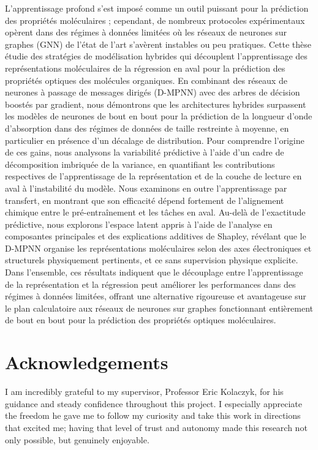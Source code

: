 \documentclass[12pt]{report}
\begin{document}
L'apprentissage profond s'est imposé comme un outil puissant pour la prédiction des propriétés moléculaires ; cependant, de nombreux protocoles expérimentaux opèrent dans des régimes à données limitées où les réseaux de neurones sur graphes (GNN) de l'état de l'art s'avèrent instables ou peu pratiques. Cette thèse étudie des stratégies de modélisation hybrides qui découplent l'apprentissage des représentations moléculaires de la régression en aval pour la prédiction des propriétés optiques des molécules organiques. En combinant des réseaux de neurones à passage de messages dirigés (D-MPNN) avec des arbres de décision boostés par gradient, nous démontrons que les architectures hybrides surpassent les modèles de neurones de bout en bout pour la prédiction de la longueur d'onde d'absorption dans des régimes de données de taille restreinte à moyenne, en particulier en présence d'un décalage de distribution. Pour comprendre l'origine de ces gains, nous analysons la variabilité prédictive à l'aide d'un cadre de décomposition imbriquée de la variance, en quantifiant les contributions respectives de l'apprentissage de la représentation et de la couche de lecture en aval à l'instabilité du modèle. Nous examinons en outre l'apprentissage par transfert, en montrant que son efficacité dépend fortement de l'alignement chimique entre le pré-entraînement et les tâches en aval. Au-delà de l'exactitude prédictive, nous explorons l'espace latent appris à l'aide de l'analyse en composantes principales et des explications additives de Shapley, révélant que le D-MPNN organise les représentations moléculaires selon des axes électroniques et structurels physiquement pertinents, et ce sans supervision physique explicite. Dans l'ensemble, ces résultats indiquent que le découplage entre l'apprentissage de la représentation et la régression peut améliorer les performances dans des régimes à données limitées, offrant une alternative rigoureuse et avantageuse sur le plan calculatoire aux réseaux de neurones sur graphes fonctionnant entièrement de bout en bout pour la prédiction des propriétés optiques moléculaires.

\chapter*{Acknowledgements}
\label{sec:ack}

I am incredibly grateful to my supervisor, Professor Eric Kolaczyk, for his guidance and steady confidence throughout this project. I especially appreciate the freedom he gave me to follow my curiosity and take this work in directions that excited me; having that level of trust and autonomy made this research not only possible, but genuinely enjoyable.
\end{document}
